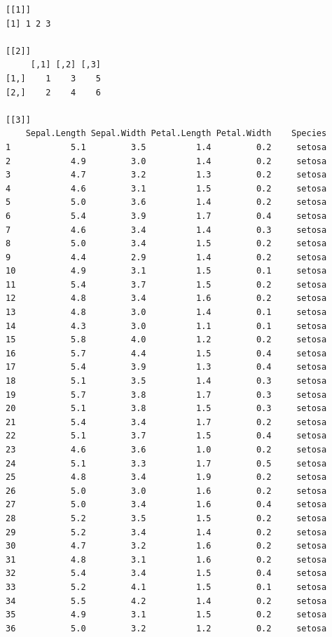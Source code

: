 \documentclass[
  letterpaper,
  DIV=11,
  numbers=noendperiod]{scrreprt}
\begin{document}
\begin{verbatim}
[[1]]
[1] 1 2 3

[[2]]
     [,1] [,2] [,3]
[1,]    1    3    5
[2,]    2    4    6

[[3]]
    Sepal.Length Sepal.Width Petal.Length Petal.Width    Species
1            5.1         3.5          1.4         0.2     setosa
2            4.9         3.0          1.4         0.2     setosa
3            4.7         3.2          1.3         0.2     setosa
4            4.6         3.1          1.5         0.2     setosa
5            5.0         3.6          1.4         0.2     setosa
6            5.4         3.9          1.7         0.4     setosa
7            4.6         3.4          1.4         0.3     setosa
8            5.0         3.4          1.5         0.2     setosa
9            4.4         2.9          1.4         0.2     setosa
10           4.9         3.1          1.5         0.1     setosa
11           5.4         3.7          1.5         0.2     setosa
12           4.8         3.4          1.6         0.2     setosa
13           4.8         3.0          1.4         0.1     setosa
14           4.3         3.0          1.1         0.1     setosa
15           5.8         4.0          1.2         0.2     setosa
16           5.7         4.4          1.5         0.4     setosa
17           5.4         3.9          1.3         0.4     setosa
18           5.1         3.5          1.4         0.3     setosa
19           5.7         3.8          1.7         0.3     setosa
20           5.1         3.8          1.5         0.3     setosa
21           5.4         3.4          1.7         0.2     setosa
22           5.1         3.7          1.5         0.4     setosa
23           4.6         3.6          1.0         0.2     setosa
24           5.1         3.3          1.7         0.5     setosa
25           4.8         3.4          1.9         0.2     setosa
26           5.0         3.0          1.6         0.2     setosa
27           5.0         3.4          1.6         0.4     setosa
28           5.2         3.5          1.5         0.2     setosa
29           5.2         3.4          1.4         0.2     setosa
30           4.7         3.2          1.6         0.2     setosa
31           4.8         3.1          1.6         0.2     setosa
32           5.4         3.4          1.5         0.4     setosa
33           5.2         4.1          1.5         0.1     setosa
34           5.5         4.2          1.4         0.2     setosa
35           4.9         3.1          1.5         0.2     setosa
36           5.0         3.2          1.2         0.2     setosa

\end{verbatim}
\end{document}
